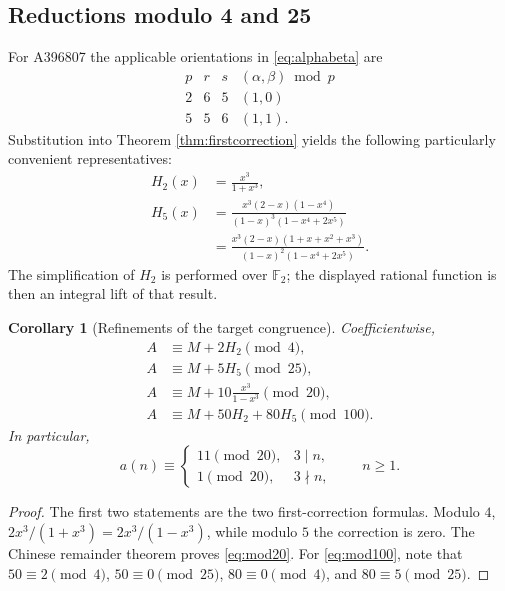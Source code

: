 \documentclass[11pt,letterpaper]{article}
\newtheorem{corollary}[theorem]{Corollary}
\theoremstyle{definition}
\theoremstyle{remark}
\newcommand{\F}{\mathbb F}
\begin{document}
\subsection{Reductions modulo 4 and 25}
For A396807 the applicable orientations in \eqref{eq:alphabeta} are
\[
 \begin{array}{c|c|c|c}
 p&r&s&(\alpha,\beta)\bmod p\\\hline
 2&6&5&(1,0)\\
 5&5&6&(1,1).
 \end{array}
\]
Substitution into Theorem \ref{thm:firstcorrection} yields the following
particularly convenient representatives:
\begin{align}
 H_2(x)&=\frac{x^3}{1+x^3},\label{eq:H2}\\
 H_5(x)&=\frac{x^3(2-x)(1-x^4)}
 {(1-x)^3(1-x^4+2x^5)}\nonumber\\
 &=\frac{x^3(2-x)(1+x+x^2+x^3)}
 {(1-x)^2(1-x^4+2x^5)}.\label{eq:H5}
\end{align}
The simplification of $H_2$ is performed over $\F_2$; the displayed
rational function is then an integral lift of that result.

\begin{corollary}[Refinements of the target congruence]\label{cor:refinements}
Coefficientwise,
\begin{align}
 A&\equiv M+2H_2\pmod4,\label{eq:mod4}\\
 A&\equiv M+5H_5\pmod {25},\label{eq:mod25}\\
 A&\equiv M+10\frac{x^3}{1-x^3}\pmod {20},\label{eq:mod20}\\
 A&\equiv M+50H_2+80H_5\pmod {100}.\label{eq:mod100}
\end{align}
In particular,
\begin{equation}\label{eq:mod20coeff}
 a(n)\equiv
 \begin{cases}11\pmod {20},&3\mid n,\\1\pmod {20},&3\nmid n,
 \end{cases}\qquad n\geq1.
\end{equation}
\end{corollary}
\begin{proof}
The first two statements are the two first-correction formulas.
Modulo $4$, $2x^3/(1+x^3)=2x^3/(1-x^3)$, while modulo $5$ the correction
is zero.  The Chinese remainder theorem proves \eqref{eq:mod20}.
For \eqref{eq:mod100}, note that $50\equiv2\pmod4$, $50\equiv0\pmod {25}$,
$80\equiv0\pmod4$, and $80\equiv5\pmod {25}$.
\end{proof}
\end{document}
